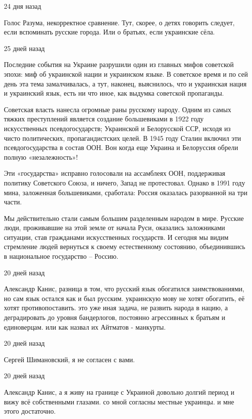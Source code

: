 \begin{itemize}
 24 дня назад

Голос Разума, некорректное сравнение. Тут, скорее, о детях говорить следует,
если вспоминать русские города. Или о братьях, если украинские сёла.

 25 дней назад  

Последние события на Украине разрушили один из главных мифов советской эпохи:
миф об украинской нации и украинском языке. В советское время и по сей день эта
тема замалчивалась, а тут, наконец, выяснилось, что и украинская нация и
украинский язык, есть ни что иное, как выдумка советской пропаганды.

Советская власть нанесла огромные раны русскому народу. Одним из самых тяжких
преступлений является создание большевиками в 1922 году искусственных
псевдогосударств; Украинской и Белорусской ССР, исходя из чисто политических,
пропагандистских целей. В 1945 году Сталин включил эти псевдогосударства в
состав ООН. Вон когда еще Украина и Белоруссия обрели полную «незалежность»!

Эти «государства» исправно голосовали на ассамблеях ООН, поддерживая политику
Советского Союза, и ничего, Запад не протестовал. Однако в 1991 году мина,
заложенная большевиками, сработала: Россия оказалась разорванной на три части.

Мы действительно стали самым большим разделенным народом в мире. Русские люди,
проживавшие на этой земле от начала Руси, оказались заложниками ситуации, став
гражданами искусственных государств. И сегодня мы видим стремление людей
вернуться к своему естественному состоянию, объединившись в национальное
государство – Россию.

 20 дней назад

Александр Канис, разница в том, что русский язык обогатился заимствованиями, но
сам язык остался как и был русским. украинскую мову не хотят обогатить, её
хотят противопоставить. это уже иная задача, не развить народа в нацию, а
деградировать до уровня бандерлогов, постоянно агрессивных к братьям и
единоверцам. или как назвал их Айтматов - манкурты.

 20 дней назад

Сергей Шимановский, я не согласен с вами.

 20 дней назад

Александр Канис, а я живу на границе с Украиной довольно долгий период и вижу
всё собственными глазами. со мной согласны местные украинцы. и мне этого
достаточно.


\end{itemize}
